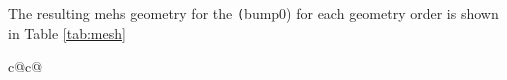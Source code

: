 \documentclass{article}
\begin{document}
	The resulting mehs geometry for the \texttt(bump0) for each geometry order is shown in Table \ref{tab:mesh}
\begin{table}[ht]
	\begin{center}
	\begin{tabular}{ c@{}c@{} }


		\hline
		\\


		\hline
		\vspace{0.1mm}\\
		\\

		\hline
		\\

		\hline
		\vspace{0.1mm}\\

		\\

		\hline
		\\

		\hline
		\vspace{0.1mm}\\

		\\
		\vspace{0.25mm}\\
	\end{tabular}
	\caption{Geometric reparation of \texttt{bump0.gri} for the each geometric representation order}
	\label{tab:mesh}
	\vspace*{-3mm}
	\end{center}
\end{table}






\end{document}
